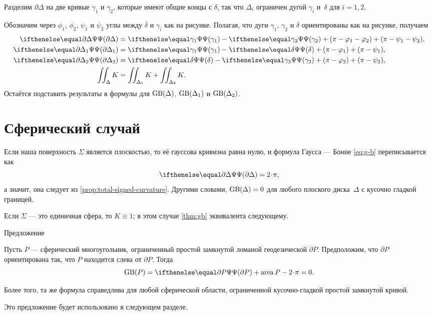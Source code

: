 Разделим $\partial \Delta$ на две кривые $\gamma_1$ и $\gamma_2$, которые имеют общие концы с $\delta$, так что
$\Delta_i$ ограничен дугой $\gamma_i$ и~$\delta$ для $i=1,2$.


Обозначим через $\phi_1$, $\phi_2$, $\psi_1$ и $\psi_2$ углы между $\delta$ и $\gamma_i$ как на рисунке.
Полагая, что дуги $\gamma_1$, $\gamma_2$ и $\delta$ ориентированы как на рисунке, получаем
\begin{align*}
\tgc{\partial \Delta}&= \tgc{\gamma_1}-\tgc{\gamma_2}+(\pi-\phi_1-\phi_2)+(\pi-\psi_1-\psi_2),
\\
\tgc{\partial \Delta_1}&= \tgc{\gamma_1}-\tgc{\delta}+(\pi-\phi_1)+(\pi-\psi_1),
\\
\tgc{\partial \Delta_2}&= \tgc{\delta}-\tgc{\gamma_2}+(\pi-\phi_2)+(\pi-\psi_2),
\\
\iint_\Delta K&=\iint_{\Delta_1} K+\iint_{\Delta_2} K.
\end{align*}
Остаётся подставить результаты в формулы для $\mathop{\rm GB}\nolimits(\Delta)$, $\mathop{\rm GB}\nolimits(\Delta_1)$ и $\mathop{\rm GB}\nolimits(\Delta_2)$.
\qeds

\section{Сферический случай}

Если наша поверхность $\Sigma$ является плоскостью, то её гауссова кривизна равна нулю, и формула Гаусса --- Бонне \ref{eq:g-b} переписывается как 
\[\tgc{\partial\Delta}=2\cdot \pi,\]
а значит, она следует из \ref{prop:total-signed-curvature}.
Другими словами, $\mathop{\rm GB}\nolimits(\Delta)=0$ для любого плоского диска~$\Delta$ с кусочно гладкой границей.

Если $\Sigma$ --- это единичная сфера, то $K\equiv1$;
в этом случае \ref{thm:gb} эквивалента следующему.

\begin{thm}{Предложение}\label{prop:area-of-spher-polygon}
{\sloppy
Пусть $P$ --- сферический многоугольник, ограниченный простой замкнутой ломаной геодезической $\partial P$.
Предположим, что $\partial P$ ориентирована так, что $P$ находится слева от $\partial P$.
Тогда 
\[\GB(P)=\tgc{\partial P}+\area P-2\cdot \pi=0.\]

}

Более того, та же формула справедлива для любой сферической области, ограниченной кусочно-гладкой простой замкнутой кривой.
\end{thm}

Это предложение будет использовано в следующем разделе.


